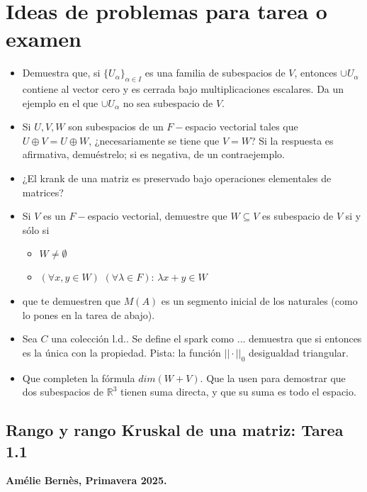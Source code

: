 \documentclass[10pt]{extreport}
\newcommand*{\IR}{\mathbb{R}}
\begin{document}
\chapter{Ideas de problemas para tarea o examen}
		\begin{itemize}
		\item Demuestra que, si $\{ U_{\alpha} \}_{\alpha \in I}$ es una familia
		de subespacios de $V$, entonces $\cup U_{\alpha}$ contiene al vector cero
		y es cerrada bajo multiplicaciones escalares. Da un ejemplo en el que
		$\cup U_{\alpha}$ no sea subespacio de $V$.
		
		\item Si $U, V, W$ son subespacios de un $F-$espacio vectorial
		tales que $U \oplus  V = U \oplus W$, ¿necesariamente
		se tiene que $V = W$? Si la respuesta es afirmativa, demuéstrelo;
		si es negativa, de un contraejemplo.
		
		\item ¿El krank de una matriz es preservado bajo operaciones elementales
		de matrices?
		
		\item Si $V$ es un $F-$espacio vectorial, demuestre que $W \subseteq V$
		es subespacio de $V$ si y sólo si 
		\begin{itemize}
			\item $W \neq \emptyset$
			\item $(\forall x, y \in W)$ $(\forall \lambda \in F)$: 
			$\lambda x + y \in W$
		\end{itemize} 
		
		\item que te demuestren que $M(A)$ es un segmento inicial de los naturales
		(como lo pones en la tarea de abajo).
		
		\item Sea $C$ una colección l.d.. Se define el spark como
		... demuestra que si
		entonces es la única con la propiedad.
		Pista: la función $|| \cdot ||_{0}$ desigualdad triangular.
		
		\item Que completen la fórmula $dim(W + V)$. Que la usen para
		demostrar que dos subespacios de $\IR^{3}$ tienen suma directa, y que
		su suma es todo el espacio.
	\end{itemize}
	
	\newpage




 
\section{Rango y rango Kruskal de una matriz: Tarea 1.1}
\begin{flushright}
	\textbf{Amélie Bernès, Primavera 2025.}
\end{flushright}
\end{document}

